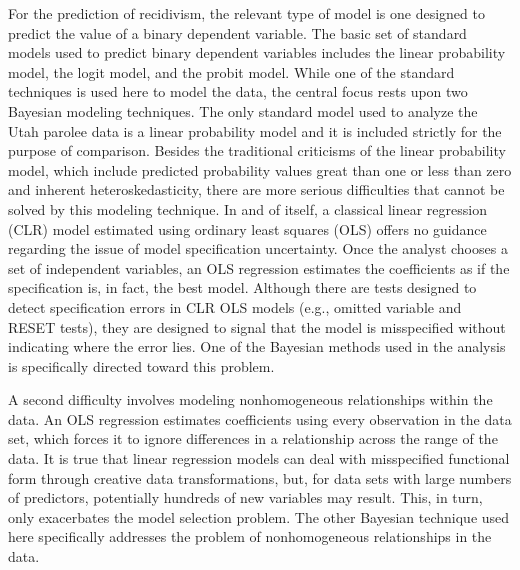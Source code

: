 For the prediction of recidivism, the relevant type of model is one designed to predict the value of a binary dependent variable.  The basic set of standard models used to predict binary dependent variables includes the linear probability model, the logit model, and the probit model.  While one of the standard techniques is used here to model the data, the central focus rests upon two Bayesian modeling techniques.  The only standard model used to analyze the Utah parolee data is a linear probability model and it is included strictly for the purpose of comparison.  Besides the traditional criticisms of the linear probability model, which include predicted probability values great than one or less than zero and inherent heteroskedasticity, there are more serious difficulties that cannot be solved by this modeling technique.  In and of itself, a classical linear regression (CLR) model estimated using ordinary least squares (OLS) offers no guidance regarding the issue of model specification uncertainty.  Once the analyst chooses a set of independent variables, an OLS regression estimates the coefficients as if the specification is, in fact, the best model.  Although there are tests designed to detect specification errors in CLR OLS models (e.g., omitted variable and RESET tests), they are designed to signal that the model is misspecified without indicating where the error lies.  One of the Bayesian methods used in the analysis is specifically directed toward this problem.

A second difficulty involves modeling nonhomogeneous relationships within the data.  An OLS regression estimates coefficients using every observation in the data set, which forces it to ignore differences in a relationship across the range of the data.  It is true that linear regression models can deal with misspecified functional form through creative data transformations, but, for data sets with large numbers of predictors, potentially hundreds of new variables may result.  This, in turn, only exacerbates the model selection problem.  The other Bayesian technique used here specifically addresses the problem of nonhomogeneous relationships in the data.

